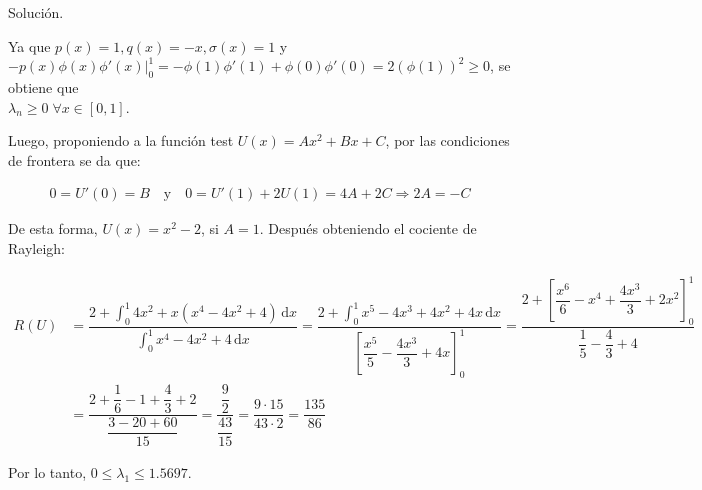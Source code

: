 \documentclass[fleqn]{article}
\newcommand{\integ}[3]{\displaystyle \int_{#1}^{#2} #3 \, \mathrm{d} x}
\begin{document}
\begin{enumerate}[I.]
\begin{enumerate}
			Solución.
			
			\normalfont

                 Ya que $ p(x) = 1, q(x) = -x, \sigma(x) = 1 $ y $ \left. -p(x) \phi(x) \phi'(x) \right|_{0}^{1} = - \phi(1) \phi'(1) + \phi(0) \phi'(0) = 2\left( \phi(1) \right)^2 \geq 0 $, se obtiene que \\ $ \lambda_n \geq 0 \; \forall x \in [0,1] $.

                Luego, proponiendo a la función test $ U(x) = Ax^2 + Bx + C$, por las condiciones de frontera se da que:

                \begin{align*}
                    0 = U'(0) = B \quad \mbox{y} \quad 0 = U'(1) + 2U(1) = 4A + 2C \Longrightarrow 2A = -C
                \end{align*}

                De esta forma, $ U(x) = x^2 - 2 $, si $ A = 1 $. Después obteniendo el cociente de Rayleigh:

                \begin{align*}
                    R(U) &= \dfrac{2 + \integ{0}{1}{4x^2 + x(x^4 - 4x^2 + 4)}}{\integ{0}{1}{x^4 - 4x^2 + 4}} = \dfrac{2 + \integ{0}{1}{x^5 - 4x^3 + 4x^2 + 4x}}{\left[ \dfrac{x^5}{5} - \dfrac{4x^3}{3} + 4x \right]_{0}^{1}} = \dfrac{2 + \left[ \dfrac{x^6}{6} - x^4 + \dfrac{4x^3}{3} + 2x^2 \right]_{0}^{1}}{\dfrac{1}{5} - \dfrac{4}{3} + 4} \\
                    &= \dfrac{2 + \dfrac{1}{6} - 1 + \dfrac{4}{3} + 2}{\dfrac{3 - 20 + 60}{15}} = \dfrac{\dfrac{9}{2}}{\dfrac{43}{15}} = \dfrac{9 \cdot 15}{43 \cdot 2} = \dfrac{135}{86} 
                \end{align*}

                Por lo tanto, $ 0 \leq \lambda_1 \leq 1.5697 $.

		\end{enumerate}
	\end{enumerate}
\end{document}
